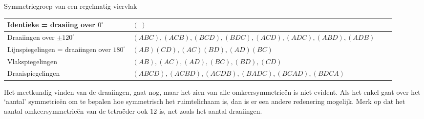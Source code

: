 \begin{lesactiviteit}{Symmetriegroep van een regelmatig viervlak}
\begin{vraagenantwoord}[resume]
\begin{center}
\begin{tabel}
\begin{tabular}{| p{4.5cm}l|p{8.5cm}l | }
		Identieke = draaiing over $0^\circ$ & $(\;)$\\
		\hline
		Draaiingen over $\pm 120^\circ$ & $(ABC), (ACB), (BCD), (BDC), (ACD), (ADC), (ABD), (ADB)$ \\
		\hline
		
		Lijnspiegelingen = draaiingen over $180^\circ$ & $(AB)(CD), (AC)(BD), (AD)(BC)$\\
		\hline
		
		Vlakspiegelingen & $(AB), (AC), (AD), (BC), (BD), (CD)$\\
		\hline
		
		Draaispiegelingen & $(ABCD), (ACBD), (ACDB), (BADC), (BCAD), (BDCA)$\\
			\hline
 			 
		\end{tabular}		
		
		\end{tabel}
		
		\end{center}
		
 \end{vraagenantwoord}

 Het meetkundig vinden van de draaiingen, gaat nog, maar het zien van alle omkeersymmetrieën is niet evident. Als het enkel gaat over het `aantal' symmetrieën om te bepalen hoe symmetrisch het ruimtelichaam is, dan is er een andere redenering mogelijk. Merk op dat het aantal omkeersymmetrieën van de tetraëder ook $12$ is, net zoals het aantal draaiingen.
 
 \begin{vraagenantwoord}[resume]
 
 
 
 
 \begin{multicols}{2}
 
 

\end{multicols}
\end{vraagenantwoord}
\end{lesactiviteit}
